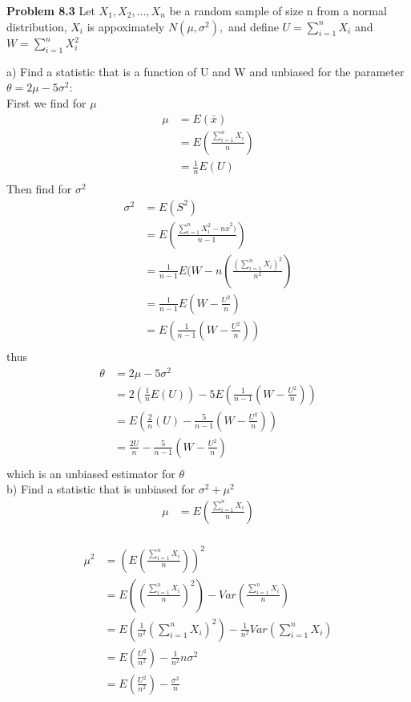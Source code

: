 
{\bf Problem 8.3}
Let $ X_{1}, X_{2},...,X_{n} $ be a random sample of size n from a normal distribution, $ X_{i} $ 
is appoximately $ N(\mu,\sigma^{2}), $ and define $ U = \sum\limits_{i=1}^n X_{i} $ and $ W = \sum\limits_{i=1}^n X_{i}^{2} $


a) Find a statistic that is a function of U and W and unbiased for the parameter $ \theta = 2\mu-5\sigma^{2} $: \\
First we find for $\mu$
\begin{align*}
	 \mu & = E(\bar{x}) \\
	 & =E(\frac{\sum\limits_{i=1}^n X_{i}}{n}) \\
	 & =\frac{1}{n}E(U) \\
\end{align*}
Then find for $\sigma^2$\\
\begin{align*}
	\sigma^{2} & = E(S^{2}) \\ 
	& = E (\frac{\sum\limits_{i=1}^n X_{i}^{2} - n\bar{x}^{2})}{n-1}) \\ 
	& = \frac{1}{n-1}E(W-n(\frac{(\sum\limits_{i=1}^n X_{i})^{2}}{n^{2}}) \\
	& = \frac{1}{n-1}E(W-\frac{U^{2}}{n}) \\ 
	& = E(\frac{1}{n-1}(W-\frac{U^{2}}{n})) \\
\end{align*}
thus
\begin{align*} 
	\theta & = 2\mu-5\sigma^{2} \\
	& = 2(\frac{1}{n}E(U))-5E(\frac{1}{n-1}(W-\frac{U^{2}}{n})) \\ 
	& = E(\frac{2}{n}(U) - \frac{5}{n-1}(W-\frac{U^{2}}{n})) \\ 
	& = \frac{2U}{n}-\frac{5}{n-1}(W-\frac{U^{2}}{n}) \\
\end{align*}
which is an unbiased estimator for $ \theta $ \\

b) Find a statistic that is unbiased for $\sigma^{2}+\mu^{2} $  \\
\begin{align*}
	\mu & = E(\frac{\sum\limits_{i=1}^n X_{i}}{n}) \\
\end{align*}

\begin{align*}
	\mu^{2} & = (E(\frac{\sum\limits_{i=1}^n X_{i}}{n}))^{2} \\
	& = E((\frac{\sum\limits_{i=1}^n X_{i}}{n})^{2}) - Var(\frac{\sum\limits_{i=1}^n X_{i}}{n}) \\ 
	& = E(\frac{1}{n^{2}}(\sum\limits_{i=1}^n X_{i})^{2})-\frac{1}{n^{2}}Var(\sum\limits_{i=1}^n X_{i}) \\ 
	& = E(\frac{U^{2}}{n^{2}})-\frac{1}{n^{2}}n\sigma^{2} \\ 
	& = E(\frac{U^{2}}{n^{2}})-\frac{\sigma^{2}}{n} \\
\end{align*}

